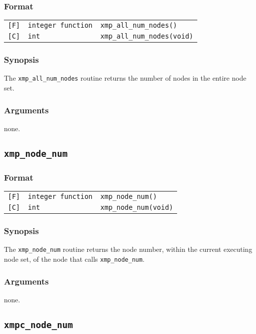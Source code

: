 \subsubsection*{Format}

\begin{tabular}{lll}
\verb![F]!&  {\tt integer function}& {\tt xmp\_all\_num\_nodes()}\\
\verb![C]!&  {\tt int}& {\tt xmp\_all\_num\_nodes(void)}
\end{tabular}

\subsubsection*{Synopsis}
The {\tt xmp\_all\_num\_nodes} routine returns the number of nodes
in the entire node set.

\subsubsection*{Arguments}
none.

\subsection{\tt xmp\_node\_num}

\subsubsection*{Format}

\begin{tabular}{lll}
\verb![F]!&  {\tt integer function}& {\tt xmp\_node\_num()}\\
\verb![C]!&  {\tt int}& {\tt xmp\_node\_num(void)}
\end{tabular}

\subsubsection*{Synopsis}
The {\tt xmp\_node\_num} routine returns the node number,
within the current executing node set, of the node that calls {\tt xmp\_node\_num}.

\subsubsection*{Arguments}
none.

\subsection{\tt xmpc\_node\_num}\label{sub:xmpcnodenum}

